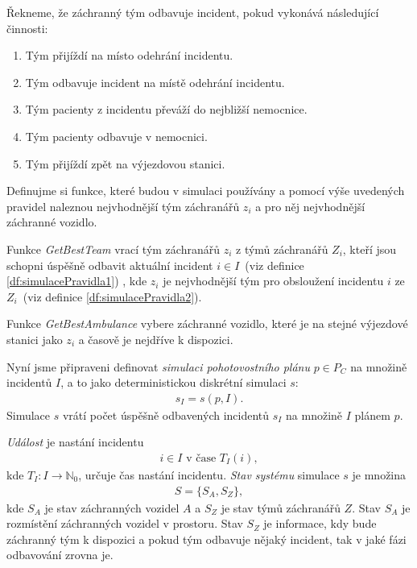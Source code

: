 \begin{definice}\label{df:odbavujeIncident}
  Řekneme, že záchranný tým odbavuje incident, pokud vykonává následující činnosti:
  \begin{enumerate}
    \item
      Tým přijíždí na místo odehrání incidentu.

    \item
      Tým odbavuje incident na místě odehrání incidentu.

    \item
      Tým pacienty z incidentu převáží do nejbližší nemocnice.

    \item
      Tým pacienty odbavuje v nemocnici.

    \item
      Tým přijíždí zpět na výjezdovou stanici.
  \end{enumerate}
\end{definice}
Definujme si funkce, které budou v simulaci používány a pomocí výše uvedených pravidel naleznou nejvhodnější tým záchranářů $z_i$
a pro něj nejvhodnější záchranné vozidlo.
\begin{definice}[GetBestTeam]\label{df:getBestTeam}
Funkce \textit{GetBestTeam} vrací tým záchranářů $z_i$ z týmů záchranářů $Z_i$, kteří jsou schopni úspěšně odbavit aktuální incident $i \in I$~(viz definice \ref{df:simulacePravidla1})
  , kde $z_i$ je nejvhodnější tým pro obsloužení incidentu $i$ ze $Z_i$~(viz definice \ref{df:simulacePravidla2}). 
\end{definice}
\begin{definice}[GetBestAmbulance]
Funkce \textit{GetBestAmbulance}\label{df:getBestAmbulance} vybere záchranné vozidlo, které je na stejné výjezdové stanici jako $z_i$ a časově je nejdříve k dispozici.
\end{definice}

Nyní jsme připraveni definovat \textit{simulaci pohotovostního plánu} $p \in P_C$ na množině incidentů $I$, a to jako deterministickou diskrétní simulaci $s$:
\begin{align*}
  s_I = s(p, I).
\end{align*}
Simulace $s$ vrátí počet úspěšně odbavených incidentů $s_I$ na množině $I$ plánem $p$. 

\textit{Událost} je nastání incidentu 
\begin{align*}
  i \in I \text{ v čase } T_I(i),
\end{align*}
kde $T_I \colon I \rightarrow \mathbb{N}_0$, určuje čas nastání incidentu.
\textit{Stav systému} simulace $s$ je množina
\begin{align*}
S = \{ S_A, S_Z \},
\end{align*}
kde $S_A$ je stav záchranných vozidel $A$ a $S_Z$ je stav týmů záchranářů $Z$. 
Stav $S_A$ je rozmístění záchranných vozidel v prostoru.
Stav $S_Z$ je informace, kdy bude záchranný tým k dispozici a pokud tým odbavuje nějaký incident, tak v jaké fázi odbavování zrovna je. 


